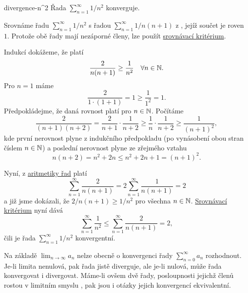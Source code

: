 \begin{lemma}{}{divergence-n^2}
 Řada $\sum_{n=1}^{\infty} 1 / n^2$ konverguje.
\end{lemma}
\begin{lemproof}
 Srovnáme řadu $\sum_{n=1}^{\infty} 1 / n^2$ s řadou $\sum_{n=1}^{\infty} 1 /
 n(n+1)$ z , jejíž součet
 je roven $1$. Protože obě řady mají nezáporné členy, lze použít
 \hyperref[prop:srovnavaci-kriterium]{srovnávací kritérium}.

 Indukcí dokážeme, že platí
 \[
  \frac{2}{n(n+1)} \geq \frac{1}{n^2} \quad \forall n \in \mathbb{N}.
 \]
 Pro $n = 1$ máme
 \[
  \frac{2}{1 \cdot (1 + 1)} = 1 \geq \frac{1}{1^2} = 1.
 \]
 Předpokládejme, že daná rovnost platí pro $n \in \mathbb{N}$. Počítáme
 \[
  \frac{2}{(n+1)(n+2)} = \frac{2}{n+1} \cdot \frac{1}{n+2} \geq \frac{1}{n}
  \cdot \frac{1}{n+2} \geq \frac{1}{(n+1)^2},
 \]
 kde první nerovnost plyne z indukčního předpokladu (po vynásobení obou stran
 číslem $n \in \mathbb{N}$) a poslední nerovnost plyne ze zřejmého vztahu
 \[
  n(n+2) = n^2 + 2n \leq n^2 + 2n + 1 = (n+1)^2.
 \]

 Nyní, z \hyperref[prop:aritmetika-ciselnych-rad]{aritmetiky řad} platí
 \[
  \sum_{n=1}^{\infty} \frac{2}{n(n+1)} = 2 \sum_{n=1}^{\infty} \frac{1}{n(n+1)}
  = 2
 \]
 a již jsme dokázali, že $2 / n(n+1) \geq 1 / n^2$ pro všechna $n \in \mathbb{N}$.
 \hyperref[prop:srovnavaci-kriterium]{Srovnávací kritérium} nyní dává
 \[
  \sum_{n=1}^{\infty} \frac{1}{n^2} \leq \sum_{n=1}^{\infty} \frac{2}{n(n+1)} =
  2,
 \]
 čili je řada $\sum_{n=1}^{\infty} 1 / n^2$ konvergentní.
\end{lemproof}

Na základě $\lim_{n \to \infty} a_n$ nelze obecně o konvergenci řady
$\sum_{n=0}^{\infty} a_n$ rozhodnout. Je-li limita nenulová, pak řada jistě
diverguje, ale je-li nulová, může řada konvergovat i divergovat. Máme-li ovšem
dvě řady, posloupnosti jejichž členů rostou v limitním smyslu , pak jsou i otázky jejich konvergencí ekvivalentní.

